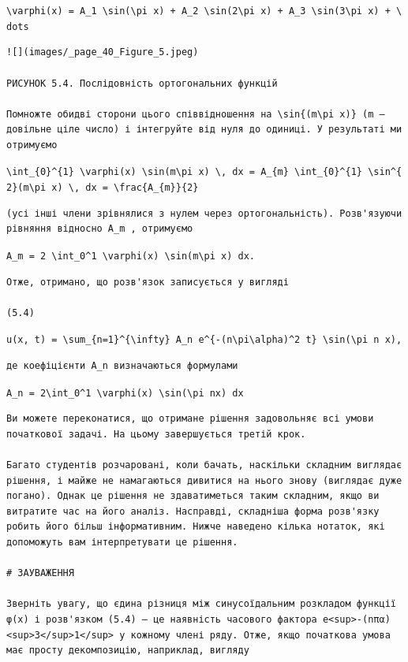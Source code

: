 \documentclass[
  ukrainian,
]{article}
\begin{document}
\texttt{\textbackslash{}varphi(x)\ =\ A\_1\ \textbackslash{}sin(\textbackslash{}pi\ x)\ +\ A\_2\ \textbackslash{}sin(2\textbackslash{}pi\ x)\ +\ A\_3\ \textbackslash{}sin(3\textbackslash{}pi\ x)\ +\ \textbackslash{}dots}

\begin{verbatim}
![](images/_page_40_Figure_5.jpeg)

РИСУНОК 5.4. Послідовність ортогональних функцій

Помножте обидві сторони цього співвідношення на \sin{(m\pi x)} (m — довільне ціле число) і інтегруйте від нуля до одиниці. У результаті ми отримуємо
\end{verbatim}

\texttt{\textbackslash{}int\_\{0\}\^{}\{1\}\ \textbackslash{}varphi(x)\ \textbackslash{}sin(m\textbackslash{}pi\ x)\ \textbackslash{},\ dx\ =\ A\_\{m\}\ \textbackslash{}int\_\{0\}\^{}\{1\}\ \textbackslash{}sin\^{}\{2\}(m\textbackslash{}pi\ x)\ \textbackslash{},\ dx\ =\ \textbackslash{}frac\{A\_\{m\}\}\{2\}}

\begin{verbatim}
(усі інші члени зрівнялися з нулем через ортогональність). Розв'язуючи рівняння відносно A_m , отримуємо
\end{verbatim}

\texttt{A\_m\ =\ 2\ \textbackslash{}int\_0\^{}1\ \textbackslash{}varphi(x)\ \textbackslash{}sin(m\textbackslash{}pi\ x)\ dx.}

\begin{verbatim}
Отже, отримано, що розв'язок записується у вигляді

(5.4)
\end{verbatim}

\texttt{u(x,\ t)\ =\ \textbackslash{}sum\_\{n=1\}\^{}\{\textbackslash{}infty\}\ A\_n\ e\^{}\{-(n\textbackslash{}pi\textbackslash{}alpha)\^{}2\ t\}\ \textbackslash{}sin(\textbackslash{}pi\ n\ x),}

\begin{verbatim}
де коефіцієнти A_n визначаються формулами
\end{verbatim}

\texttt{A\_n\ =\ 2\textbackslash{}int\_0\^{}1\ \textbackslash{}varphi(x)\ \textbackslash{}sin(\textbackslash{}pi\ nx)\ dx}

\begin{verbatim}
Ви можете переконатися, що отримане рішення задовольняє всі умови початкової задачі. На цьому завершується третій крок.

Багато студентів розчаровані, коли бачать, наскільки складним виглядає рішення, і майже не намагаються дивитися на нього знову (виглядає дуже погано). Однак це рішення не здаватиметься таким складним, якщо ви витратите час на його аналіз. Насправді, складніша форма розв'язку робить його більш інформативним. Нижче наведено кілька нотаток, які допоможуть вам інтерпретувати це рішення.

# ЗАУВАЖЕННЯ

Зверніть увагу, що єдина різниця між синусоїдальним розкладом функції φ(x) і розв'язком (5.4) — це наявність часового фактора e<sup>-(nπα)<sup>3</sup>1</sup> у кожному члені ряду. Отже, якщо початкова умова має просту декомпозицію, наприклад, вигляду
\end{verbatim}
\end{document}
